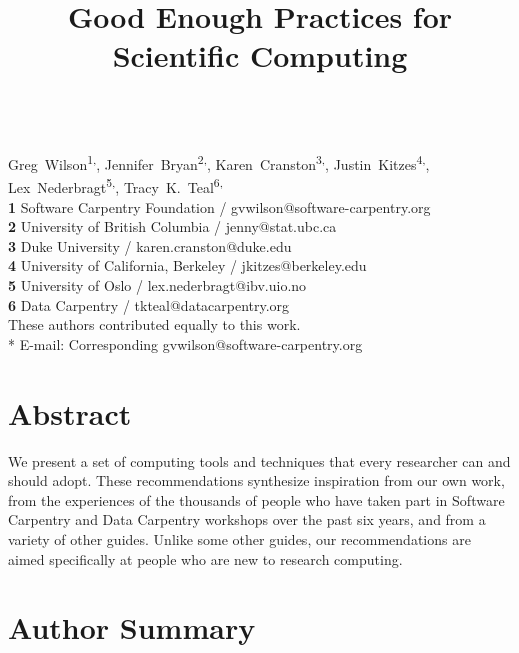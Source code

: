 \documentclass[10pt,letterpaper]{article}
\date{}
\begin{document}
\vspace*{0.2in}

\begin{flushleft}
{\Large
\textbf{}
}
\newline
\\
{Greg~Wilson}\textsuperscript{1,\ddag *},
{Jennifer~Bryan}\textsuperscript{2,\ddag},
{Karen~Cranston}\textsuperscript{3,\ddag},
{Justin~Kitzes}\textsuperscript{4,\ddag},
{Lex~Nederbragt}\textsuperscript{5,\ddag},
{Tracy~K.~Teal}\textsuperscript{6,\ddag}
\\
\textbf{1} Software Carpentry Foundation / gvwilson@software-carpentry.org
\\
\textbf{2} University of British Columbia / jenny@stat.ubc.ca
\\
\textbf{3} Duke University / karen.cranston@duke.edu
\\
\textbf{4} University of California, Berkeley / jkitzes@berkeley.edu
\\
\textbf{5} University of Oslo / lex.nederbragt@ibv.uio.no
\\
\textbf{6} Data Carpentry / tkteal@datacarpentry.org
\\
\bigskip
{\ddag} These authors contributed equally to this work.
\\
* E-mail: Corresponding gvwilson@software-carpentry.org

\end{flushleft}

\title{Good Enough Practices for Scientific Computing}

\section*{Abstract}

We present a set of computing tools and techniques that every
researcher can and should adopt.  These recommendations synthesize
inspiration from our own work, from the experiences of the thousands
of people who have taken part in Software Carpentry and Data Carpentry
workshops over the past six years, and from a variety of other guides.
Unlike some other guides, our recommendations are aimed specifically
at people who are new to research computing.

\section*{Author Summary}
\end{document}
